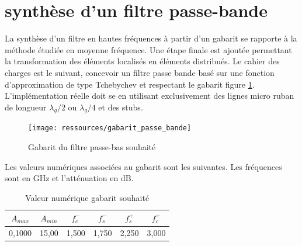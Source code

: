 \documentclass[french]{article}
\begin{document}
\section{synthèse d'un filtre passe-bande}

La synthèse d'un filtre en hautes fréquences à partir d'un gabarit se rapporte à la méthode étudiée en moyenne fréquence. Une étape finale est ajoutée permettant la transformation des éléments localisés en éléments distribués.
Le cahier des charges est le suivant, concevoir un filtre passe bande basé sur une fonction d'approximation de type Tchebychev et respectant le gabarit figure \ref{fig:gab}. L'implémentation réelle doit se en utilisant exclusivement des lignes micro ruban de longueur $\lambda_g/2$ ou $\lambda_g/4$ et des stubs.

\begin{figure}[H]
	\centering
	\texttt{[image: ressources/gabarit\_passe\_bande]}
	\caption{Gabarit du filtre passe-bas souhaité}
	\label{fig:gab}
\end{figure}
Les valeurs numériques associées au gabarit sont les suivantes. Les fréquences sont en GHz et l'atténuation en dB. 
	\begin{table}[H]
		\centering
\begin{tabular}{|c|c|c|c|c|c|}
		\hline
	$A_{max}$& $A_{min}$ & $f_c^-$ & $f_s^-$ & $f_s^+$ &$f_c^+$ \\ \hline
	0,1000	 & 15,00 		& 1,500	   & 1,750 & 2,250& 3,000 \\ \hline
	\end{tabular}
\caption{Valeur numérique gabarit souhaité}
	\end{table}
\end{document}
